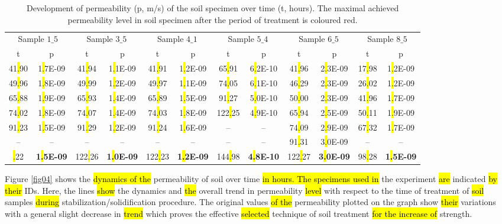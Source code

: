 \documentclass[algorithms,article,submit,pdftex,moreauthors]{Definitions/mdpi}
\begin{document}
\begin{table}[H] 
\caption{Development of permeability (p, m/s) of the soil specimen over time (t, hours). The maximal achieved permeability level in soil specimen after the period of treatment is coloured red.\label{tab02}}
\renewcommand{\arraystretch}{1.1}
\begin{adjustbox}{width=1\textwidth}
\begin{tabular}{cc|cc|cc|cc|cc|cc}
\toprule
\multicolumn{2}{c}{Sample $1\_5$} & \multicolumn{2}{c}{Sample $3\_5$} & \multicolumn{2}{c}{Sample $4\_1$} & \multicolumn{2}{c}{Sample $5\_4$} & \multicolumn{2}{c}{Sample $6\_5$} & \multicolumn{2}{c}{Sample $8\_5$}\\
\cmidrule(lr){1-2}\cmidrule(lr){3-4}\cmidrule(lr){5-6}\cmidrule(lr){7-8}\cmidrule(lr){9-10}\cmidrule(lr){11-12}
t & p & t & p & t & p & t & p & t & p & t & p\\
\midrule
41\hl{.}90 &1\hl{.}7E-09 & 41\hl{.}94 &1\hl{.}1E-09 & 41\hl{.}91 & 1\hl{.}2E-09 & 65\hl{.}91 & 6\hl{.}2E-10 & 41\hl{.}96 & 2\hl{.}3E-09 & 17\hl{.}98 & 1\hl{.}2E-09 \\
49\hl{.}96 &1\hl{.}8E-09 & 49\hl{.}99 &1\hl{.}2E-09 & 49\hl{.}97 & 1\hl{.}1E-09 & 74\hl{.}05 & 6\hl{.}1E-10 & 46\hl{.}29 & 2\hl{.}3E-09 & 26\hl{.}02 & 1\hl{.}2E-09 \\
65\hl{.}88 &1\hl{.}9E-09 & 65\hl{.}93 &1\hl{.}4E-09 & 65\hl{.}89 & 1\hl{.}5E-09 & 91\hl{.}27 & 5\hl{.}0E-10 & 50\hl{.}00 & 2\hl{.}3E-09 & 41\hl{.}96 & 1\hl{.}7E-09 \\
74\hl{.}02 &1\hl{.}8E-09 & 74\hl{.}07 &1\hl{.}4E-09 & 74\hl{.}03 & 1\hl{.}8E-09 & 122\hl{.}25 & 4\hl{.}9E-10 & 65\hl{.}94 & 2\hl{.}5E-09 & 50\hl{.}11 & 1\hl{.}9E-09 \\
91\hl{.}23 &1\hl{.}5E-09 & 91\hl{.}29 &1\hl{.}2E-09 & 91\hl{.}24 & 1\hl{.}6E-09 & -- &-- & 74\hl{.}09 & 2\hl{.}9E-09 & 67\hl{.}32 & 1\hl{.}7E-09 \\
-- &-- & -- & -- & -- & -- & -- &-- & 91\hl{.}31 & 3\hl{.}0E-09 & -- & --\\ \addlinespace
\hline
122\hl{.}22 & \textbf{1\hl{.}5E-09} & 122\hl{.}26 & \textbf{1\hl{.}0E-09} &122\hl{.}23 & \textbf{1\hl{.}2E-09} & 144\hl{.}98 & \textbf{4\hl{.}8E-10} & 122\hl{.}27 & \textbf{3\hl{.}0E-09} & 98\hl{.}28 & \textbf{1\hl{.}5E-09}\\
\bottomrule
\end{tabular}
\end{adjustbox}
\end{table}

Figure \ref{fig04} shows the \hl{dynamics of the }permeability of soil over time\hl{ in hours. The specimens used in} the experiment \hl{are} indicated \hl{by their }IDs. Here, the lines \hl{show} the dynamics and \hl{the }overall trend in permeability \hl{level }with respect to the time of treatment of \hl{soil }samples \hl{during} stabilization/solidification procedure. The original values \hl{of the }permeability plotted on the graph show \hl{their} variations with a general slight decrease in \hl{trend} which proves the effective \hl{selected }technique of soil treatment \hl{for the increase of }strength.
\end{document}
